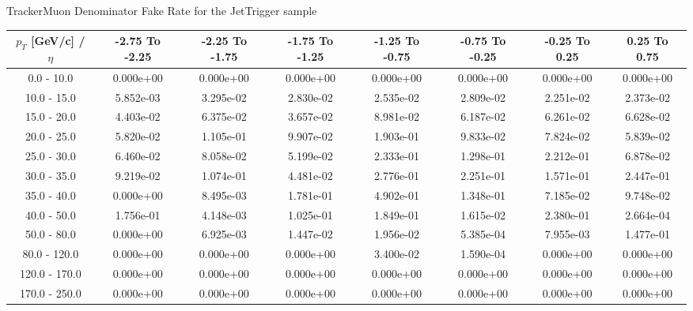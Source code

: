 \large 
TrackerMuon Denominator Fake Rate for the JetTrigger sample
\footnotesize 
\begin{tabular*}{\textwidth}{|c|c|c|c|c|c|c|c|}\hline 
$p_T$ [GeV/c] / $\eta$  & -2.75 To -2.25 & -2.25 To -1.75 & -1.75 To -1.25 & -1.25 To -0.75 & -0.75 To -0.25 & -0.25 To 0.25 & 0.25 To 0.75 \\ 
 \hline 
0.0 - 10.0 & 0.000e+00 & 0.000e+00 & 0.000e+00 & 0.000e+00 & 0.000e+00 & 0.000e+00 & 0.000e+00 \\ 
10.0 - 15.0 & 5.852e-03 & 3.295e-02 & 2.830e-02 & 2.535e-02 & 2.809e-02 & 2.251e-02 & 2.373e-02 \\ 
15.0 - 20.0 & 4.403e-02 & 6.375e-02 & 3.657e-02 & 8.981e-02 & 6.187e-02 & 6.261e-02 & 6.628e-02 \\ 
20.0 - 25.0 & 5.820e-02 & 1.105e-01 & 9.907e-02 & 1.903e-01 & 9.833e-02 & 7.824e-02 & 5.839e-02 \\ 
25.0 - 30.0 & 6.460e-02 & 8.058e-02 & 5.199e-02 & 2.333e-01 & 1.298e-01 & 2.212e-01 & 6.878e-02 \\ 
30.0 - 35.0 & 9.219e-02 & 1.074e-01 & 4.481e-02 & 2.776e-01 & 2.251e-01 & 1.571e-01 & 2.447e-01 \\ 
35.0 - 40.0 & 0.000e+00 & 8.495e-03 & 1.781e-01 & 4.902e-01 & 1.348e-01 & 7.185e-02 & 9.748e-02 \\ 
40.0 - 50.0 & 1.756e-01 & 4.148e-03 & 1.025e-01 & 1.849e-01 & 1.615e-02 & 2.380e-01 & 2.664e-04 \\ 
50.0 - 80.0 & 0.000e+00 & 6.925e-03 & 1.447e-02 & 1.956e-02 & 5.385e-04 & 7.955e-03 & 1.477e-01 \\ 
80.0 - 120.0 & 0.000e+00 & 0.000e+00 & 0.000e+00 & 3.400e-02 & 1.590e-04 & 0.000e+00 & 0.000e+00 \\ 
120.0 - 170.0 & 0.000e+00 & 0.000e+00 & 0.000e+00 & 0.000e+00 & 0.000e+00 & 0.000e+00 & 0.000e+00 \\ 
170.0 - 250.0 & 0.000e+00 & 0.000e+00 & 0.000e+00 & 0.000e+00 & 0.000e+00 & 0.000e+00 & 0.000e+00 \\ 
 \hline 
\end{tabular*} 
